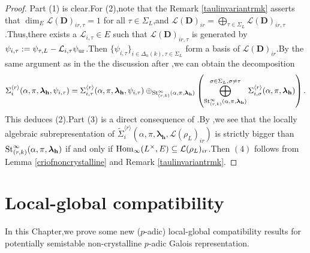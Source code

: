 \documentclass[SecEq,CM,GP]{degruyter-crelle} %
\theoremstyle{plain}
\newcommand{\Dpik}{{\mathbf{D}}}
\newcommand{\homo}{{\rm Hom}}
\newcommand{\lrr}{{\langle r\rangle}}
\newcommand{\st}{{\rm St}}
\newcommand{\ur}{{\rm ur}}
\newcommand{\bL}{{\mathbf{L}}}
\newcommand{\bh}{{\mathbf{h}}}
\newcommand{\sL}{\mathcal L}
\begin{document}
\begin{proof}Part (1) is clear.\;\;For (2),\;note that the Remark \ref{taulinvariantrmk} asserts that $\dim_E\sL(\Dpik)_{ir,\tau}=1$ for all $\tau\in \Sigma_L$,\;and $\sL(\Dpik)_{ir}=\bigoplus_{\tau\in \Sigma_L}\sL(\Dpik)_{ir,\tau}$.\;Thus,\;there exists a $\sL_{i,\tau}\in E$ such that $\sL(\Dpik)_{ir,\tau}$ is generated by $\psi_{i,\tau}:=\psi_{\tau,L}-\sL_{i,\tau}\psi_{\ur}$.\;Then $\{\psi_{i,\tau}\}_{i\in\Delta_n(k),\tau\in \Sigma_L}$ form a basis of $\sL(\Dpik)_{ir}$.\;By the same argument as in the  the discussion after \cite[Lem.]{2019DINGSimple},\;we can obtain the decomposition
\[{\Sigma}_i^{\lrr}(\alpha,\pi, {\bm\lambda}_\bh, \psi_{i,\tau})={\Sigma}^{\lrr}_{i,\tau}(\alpha,\pi, {\bm\lambda}_\bh, \psi_{i,\tau})\oplus_{\st_{(r,k)}^{\infty}(\alpha,\pi, {\bm\lambda}_\bh)}\left(
\bigoplus_{\st_{(r,k)}^{\infty}(\alpha,\pi, {\bm\lambda}_\bh)}^{\sigma\in\Sigma_L,\sigma\neq\tau} \Sigma_{i,\sigma}^{\lrr}(\alpha,\pi, {\bm\lambda}_\bh)\right).\]
This deduces (2).\;Part (3) is a direct consequence of \cite[Proposition 5.28]{2022ext1hyq}.\;By \cite[Remark 5.21]{2022ext1hyq},\;we see that the locally algebraic subrepresentation of $\widetilde{\Sigma}_i^{\lrr}(\alpha,\pi,{\bm\lambda}_\bh, \sL(\rho_L)_{ir})$ is strictly bigger than\\ $\st_{(r,k)}^{\infty}(\alpha,\pi,{\bm\lambda}_\bh)$ if and only if $\homo_{\infty}(L^{\times}, E)\subseteq \sL(\rho_L)_{ir}$.\;Then $(4)$ follows from Lemma \ref{criofnoncrystalline} and Remark \ref{taulinvariantrmk}.\;
\end{proof}
\section{Local-global compatibility}

In this Chapter,\;we prove some new ($p$-adic) local-global compatibility results  for  potentially semistable non-crystalline $p$-adic Galois representation.\;
\end{document}
